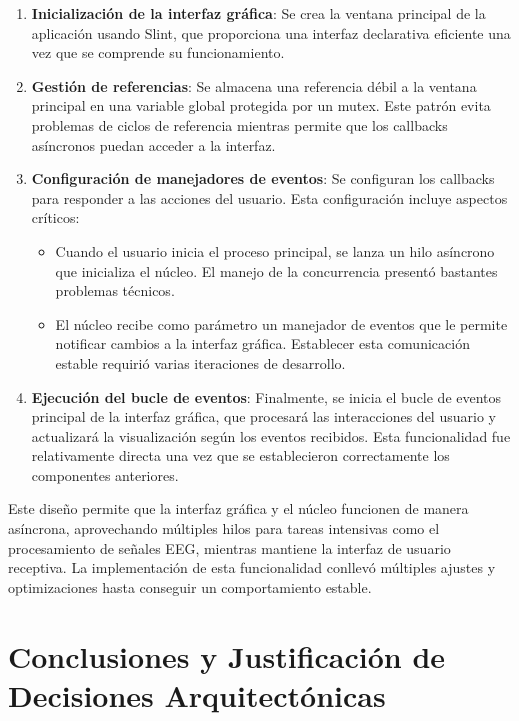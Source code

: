 \begin{enumerate}
    \item \textbf{Inicialización de la interfaz gráfica}: Se crea la ventana principal de la aplicación usando Slint, que proporciona una interfaz declarativa eficiente una vez que se comprende su funcionamiento.
    
    \item \textbf{Gestión de referencias}: Se almacena una referencia débil a la ventana principal en una variable global protegida por un mutex. Este patrón evita problemas de ciclos de referencia mientras permite que los callbacks asíncronos puedan acceder a la interfaz.
    
    \item \textbf{Configuración de manejadores de eventos}: Se configuran los callbacks para responder a las acciones del usuario. Esta configuración incluye aspectos críticos:
    \begin{itemize}
        \item Cuando el usuario inicia el proceso principal, se lanza un hilo asíncrono que inicializa el núcleo. El manejo de la concurrencia presentó bastantes problemas técnicos.
        \item El núcleo recibe como parámetro un manejador de eventos que le permite notificar cambios a la interfaz gráfica. Establecer esta comunicación estable requirió varias iteraciones de desarrollo.
    \end{itemize}
    
    \item \textbf{Ejecución del bucle de eventos}: Finalmente, se inicia el bucle de eventos principal de la interfaz gráfica, que procesará las interacciones del usuario y actualizará la visualización según los eventos recibidos. Esta funcionalidad fue relativamente directa una vez que se establecieron correctamente los componentes anteriores.
\end{enumerate}

Este diseño permite que la interfaz gráfica y el núcleo funcionen de manera asíncrona, aprovechando múltiples hilos para tareas intensivas como el procesamiento de señales EEG, mientras mantiene la interfaz de usuario receptiva. La implementación de esta funcionalidad conllevó múltiples ajustes y optimizaciones hasta conseguir un comportamiento estable.

\newpage
\section{Conclusiones y Justificación de Decisiones Arquitectónicas}

